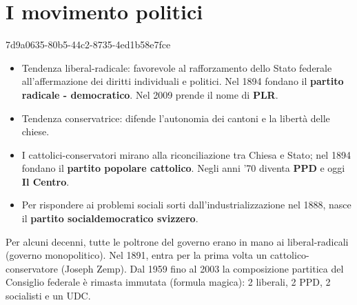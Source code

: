\documentclass[preview]{standalone}
\begin{document}
\section{I movimento politici}

\begin{snippet}{7d9a0635-80b5-44c2-8735-4ed1b58e7fce}
    \begin{itemize}
        \item Tendenza liberal-radicale: favorevole al rafforzamento dello Stato federale all'affermazione dei diritti individuali e politici.
        Nel 1894 fondano il \textbf{partito radicale - democratico}.
        Nel 2009 prende il nome di \textbf{PLR}.
        \item Tendenza conservatrice: difende l'autonomia dei cantoni e la libertà delle chiese.
        \item I cattolici-conservatori mirano alla riconciliazione tra Chiesa e Stato; nel 1894 fondano il \textbf{partito popolare cattolico}.
        Negli anni '70 diventa \textbf{PPD} e oggi \textbf{Il Centro}.
        \item Per rispondere ai problemi sociali sorti dall'industrializzazione nel 1888, nasce il \textbf{partito socialdemocratico svizzero}.
    \end{itemize}
    
    Per alcuni decenni, tutte le poltrone del governo erano in mano ai liberal-radicali (governo monopolitico).
    Nel 1891, entra per la prima volta un cattolico-conservatore (Joseph Zemp).
    Dal 1959 fino al 2003 la composizione partitica del Consiglio federale è rimasta immutata (formula magica):
    2 liberali, 2 PPD, 2 socialisti e un UDC.
\end{snippet}
\end{document}
